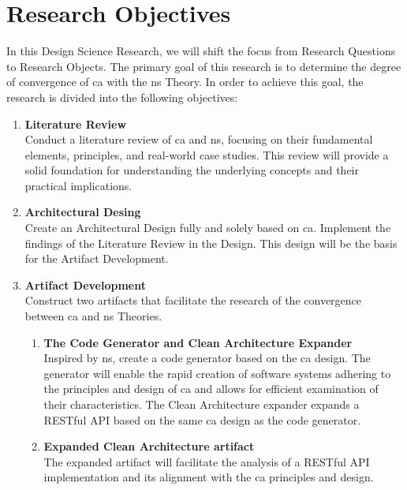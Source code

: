 \section{Research Objectives} \label{sec_research_objectives}

In this Design Science Research, we will shift the focus from Research Questions to
Research Objects. The primary goal of this research is to determine the degree of
convergence of \gls{ca} with the \gls{ns} Theory. In order to achieve this goal, the
research is divided into the following objectives:

\begin{enumerate}
    \item \textbf{Literature Review} \\
    Conduct a literature review of \gls{ca} and \gls{ns}, focusing on their
    fundamental elements, principles, and real-world case studies. This review will
    provide a solid foundation for understanding the underlying concepts and their
    practical implications.
    
    \item \textbf{Architectural Desing} \\
    Create an Architectural Design fully and solely based on \gls{ca}. Implement the
    findings of the Literature Review in the Design. This design will be the basis for
    the Artifact Development.

    \item \textbf{Artifact Development} \\
    Construct two artifacts that facilitate the research of the convergence
    between \gls{ca} and \gls{ns} Theories.
    \begin{enumerate}[label*={\arabic*.}]
        
        \item \textbf{The Code Generator and Clean Architecture Expander} \\
        Inspired by \gls{ns}, create a code generator based on the \gls{ca} design. The
        generator will enable the rapid creation of software systems adhering to the
        principles and design of \gls{ca} and allows for efficient examination of their
        characteristics. The Clean Architecture expander expands a RESTful API based on
        the same \gls{ca} design as the code generator. 
        
        \item \textbf{Expanded Clean Architecture artifact} \\
        The expanded artifact will facilitate the analysis of a RESTful API implementation
        and its alignment with the \gls{ca} principles and design.
        

\end{enumerate}
\end{enumerate}
